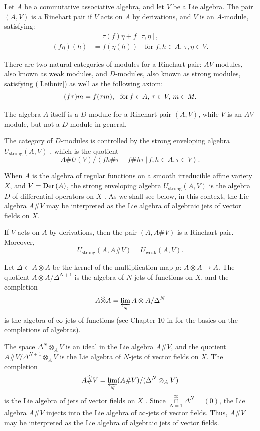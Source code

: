 \documentclass[12pt]{amsart}
\begin{document}
\begin{definition}
Let $A$ be a commutative associative algebra, and let $V$ be a Lie algebra. The pair $(A, V)$ is a Rinehart pair if $V$ acts on $A$ by derivations, and $V$ is an $A$-module, satisfying:
\begin{align*}
[\tau, f\eta] &= \tau(f) \eta + f [\tau,\eta], \\
(f\eta)(h) &= f (\eta(h)) \quad \text{for \ }  f, h \in A,\, \tau, \eta \in V.
\end{align*}
\end{definition}

There are two natural categories of modules for a Rinehart pair: $AV$-modules, also known as weak modules,  and $D$-modules, also known as strong modules, satisfying (\ref{Leibniz}) as well as the following axiom:
\begin{equation}
\label{Dmod}
(f \tau) m = f (\tau m), \ \ \text{for\,} f \in A, \, \tau \in V, \, m \in M.
\end{equation}

The algebra $A$ itself is a $D$-module for a Rinehart pair $(A, V)$, while $V$ is an $AV$-module, but not a $D$-module in general. 

The category of $D$-modules is controlled by the strong enveloping algebra $U_{\text{strong}}(A, V)$
\cite{Ri}, which  is the quotient
$$A \# U(V) / \left< fh \# \tau - f\#h\tau \ \big| \, f, h \in A, \tau\in V \right>.$$

When $A$ is the algebra of regular functions on a smooth irreducible affine variety $X$, and $V = \textup{Der\,} (A)$, the strong enveloping algebra $U_{\text{strong}}(A, V)$ is the algebra $D$ of differential operators on $X$ 
\cite{Ba}.
As we shall see below, in this context, the Lie algebra $A \# V$ may be interpreted as the Lie algebra of algebraic jets of vector fields on $X$.

If $V$ acts on $A$ by derivations, then the pair $(A, A\# V)$ is a Rinehart pair. Moreover,
$$U_{\text{strong}}(A, A\#V) = U_{\text{weak}}(A, V).$$

Let $\Delta \subset A \otimes A$ be the kernel of the multiplication map $\mu:\,A \otimes A \rightarrow A$. The quotient $A \otimes A/ \Delta^{N+1}$ is the algebra of $N$-jets of functions on $X$, and the completion
$$A \widehat\otimes A = \varprojlim\limits_N A \otimes A / \Delta^N$$
is the algebra of $\infty$-jets of functions (see Chapter 10 in \cite{AM} for the basics on the completions of algebras).

The space $\Delta^N \otimes_A V$ is an ideal in the Lie algebra $A \# V$, and the quotient  \break
$A \# V/ \Delta^{N+1} \otimes_A V$ is the Lie algebra of $N$-jets of vector fields on $X$. The completion
$$ A \widehat\# V =  \varprojlim\limits_N (A \# V) / (\Delta^N \otimes_A V)$$
is the Lie algebra of jets of vector fields on $X$ \cite{BI}. Since $\mathop\cap\limits_{N=1}^\infty \Delta^N = (0)$, the Lie algebra $A\#V$ injects into the Lie algebra of $\infty$-jets of vector fields. Thus, $A\#V$ may be interpreted as the Lie algebra of algebraic jets of vector fields.
\end{document}

